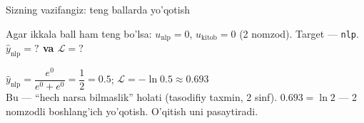 \documentclass[aspectratio=169,11pt]{beamer}
\begin{document}
\begin{frame}{Sizning vazifangiz: teng ballarda yo'qotish}
  \begin{tcolorbox}[warnbox,title=Savol --- 90 soniya]
    \small
    Agar ikkala ball ham teng bo'lsa: $u_{\text{nlp}}=0$, $u_{\text{kitob}}=0$
    (2 nomzod). Target --- \texttt{nlp}.\\[4pt]
    \textbf{\large $\hat{y}_{\text{nlp}} = ?$ \quad va \quad $\mathcal{L} = ?$}
  \end{tcolorbox}
  \pause
  \begin{tcolorbox}[okbox,title=Javob]
    \small
    $\hat{y}_{\text{nlp}} = \dfrac{e^{0}}{e^{0}+e^{0}} = \dfrac{1}{2} = \mathbf{0.5}$;
    \quad $\mathcal{L} = -\ln 0.5 \approx \mathbf{0.693}$\\[3pt]
    \footnotesize Bu --- ``hech narsa bilmaslik'' holati (tasodifiy taxmin,
    2 sinf). $0.693 = \ln 2$ --- 2 nomzodli boshlang'ich yo'qotish. O'qitish uni
    pasaytiradi.
  \end{tcolorbox}
\end{frame}
\end{document}
